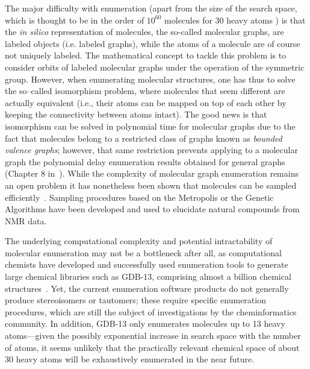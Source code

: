 \documentclass{sig-alternate}
\begin{document}
The major difficulty with enumeration (apart from the size of the
search space, which is thought to be in the order of $10^{60}$
molecules for 30 heavy atoms \cite{Bohacek:1996ve}) is that the
\emph{in silico} representation of molecules, the so-called molecular
graphs, are labeled objects (i.e. labeled graphs), while the atoms of
a molecule are of course not uniquely labeled. The mathematical
concept to tackle this problem is to consider orbits of labeled
molecular graphs under the operation of the symmetric group. However,
when enumerating molecular structures, one has thus to solve the
so--called isomorphism problem, where molecules that seem different
are actually equivalent (i.e., their atoms can be mapped on top of
each other by keeping the connectivity between atoms intact).  The
good news is that isomorphism can be solved in polynomial time for
molecular graphs due to the fact that molecules belong to a restricted
class of graphs known as \emph{bounded valence graphs}; however, that
same restriction prevents applying to a molecular graph the polynomial
delay enumeration results obtained for general graphs (Chapter 8
in~\cite{faulon2010}). While the complexity of molecular graph
enumeration remains an open problem it has nonetheless been shown that
molecules can be sampled efficiently~\cite{goldberg1999}. Sampling
procedures based on the Metropolis or the Genetic Algorithms have been
developed and used to elucidate natural compounds from NMR data.

The underlying computational complexity and potential intractability
of molecular enumeration may not be a bottleneck after all, as
computational chemists have developed and successfully used
enumeration tools to generate large chemical libraries such as GDB-13,
comprising almost a billion chemical structures~\cite{GDB}. Yet, the
current enumeration software products do not generally produce
stereoisomers or tautomers; these require specific enumeration
procedures, which are still the subject of investigations by the
cheminformatics community. In addition, GDB-13 only enumerates
molecules up to 13 heavy atoms---given the possibly exponential
increase in search space with the number of atoms, it seems unlikely
that the practically relevant chemical space of about 30 heavy atoms
will be exhaustively enumerated in the near future.
\end{document}
